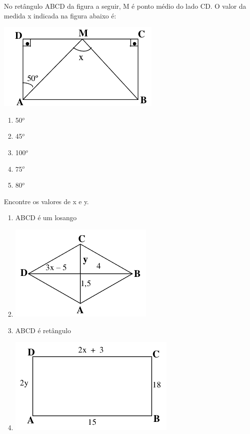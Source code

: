 				\item No retângulo ABCD da figura a seguir, M é ponto médio do lado CD. O valor da medida x indicada na figura abaixo é:
				\begin{center}
				\includegraphics[scale=0.7]{figuras/fig34.png}
				\end{center}
				\begin{multicols}{5}
				\begin{enumerate}
					\item 50$^o$
					\item 45$^o$
					\item 100$^o$
					\item 75$^o$
					\item 80$^o$
				\end{enumerate}
				\end{multicols}
				
				\item Encontre os valores de x e y.
				\begin{multicols}{2}
				\begin{enumerate}
					\item ABCD é um losango
					\item[] \includegraphics[scale=0.7]{figuras/fig35}
					\item ABCD é retângulo
					\item[] \includegraphics[scale=0.7]{figuras/fig36}
				\end{enumerate}
				\end{multicols}
				
